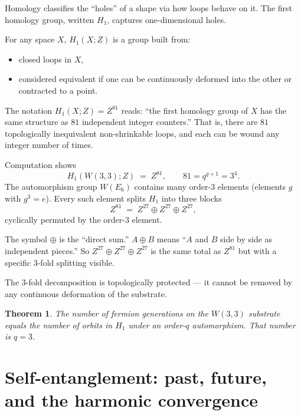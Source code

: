 \documentclass[11pt]{article}
\def\mathbb#1{#1}%
\def\textbf#1{#1}%
\newtheorem*{theorem}{Theorem}
\newcommand{\W}{W(3,3)}
\begin{document}
\begin{mathnote}
\textbf{Homology} classifies the ``holes'' of a shape via how loops behave on it. The \textbf{first homology group}, written $H_1$, captures one-dimensional holes.

For any space $X$, $H_1(X; \mathbb{Z})$ is a group built from:
\begin{itemize}[leftmargin=2em]
\item closed loops in $X$,
\item considered equivalent if one can be continuously deformed into the other or contracted to a point.
\end{itemize}

The notation $H_1(X; \mathbb{Z}) = \mathbb{Z}^{81}$ reads: ``the first homology group of $X$ has the same structure as $81$ independent integer counters.'' That is, there are $81$ topologically inequivalent non-shrinkable loops, and each can be wound any integer number of times.
\end{mathnote}

Computation shows
\[
H_1(\W; \mathbb{Z}) \;=\; \mathbb{Z}^{81}, \qquad 81 = q^{q+1} = 3^4.
\]
The automorphism group $W(E_6)$ contains many order-$3$ elements (elements $g$ with $g^3 = e$). Every such element splits $H_1$ into three blocks
\[
\mathbb{Z}^{81} \;=\; \mathbb{Z}^{27} \oplus \mathbb{Z}^{27} \oplus \mathbb{Z}^{27},
\]
cyclically permuted by the order-$3$ element.

\begin{mathnote}
The symbol $\oplus$ is the ``direct sum.'' $A \oplus B$ means ``$A$ and $B$ side by side as independent pieces.'' So $\mathbb{Z}^{27} \oplus \mathbb{Z}^{27} \oplus \mathbb{Z}^{27}$ is the same total as $\mathbb{Z}^{81}$ but with a specific $3$-fold splitting visible.
\end{mathnote}

The $3$-fold decomposition is topologically protected --- it cannot be removed by any continuous deformation of the substrate.

\begin{theorem}
The number of fermion generations on the $\W$ substrate equals the number of orbits in $H_1$ under an order-$q$ automorphism. That number is $q = 3$.
\end{theorem}

\section{Self-entanglement: past, future, and the harmonic convergence}
\label{sec:foreveryone_self_entanglement}
\end{document}
